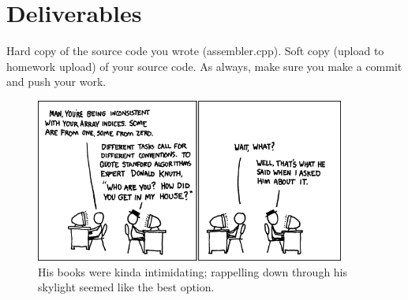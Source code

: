 \documentclass[letterpaper,12pt]{article}
\begin{document}
\section*{Deliverables}
Hard copy of the source code you wrote (assembler.cpp). Soft copy (upload to homework upload) of
your source code. As always, make sure you make a commit and push your work.

\begin{figure}[ht!]
	\centering
	\includegraphics[width=4in]{donald_knuth.png}
    \caption*{His books were kinda intimidating; rappelling down through his skylight seemed like the best option.}
\end{figure}
\end{document}
